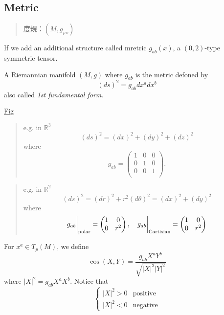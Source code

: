 \subsection{Metric} %

\begin{quote}
	度規：$(M,g_{\mu\nu})$
\end{quote}

If we add an additional structure called mretric $g_{ab}(x)$, a $(0,2)$-type symmetric tensor.


A Riemannian manifold $(M,g)$ where $g_{ab}$ is the metric defoned by
\begin{equation}
(ds)^{2} = g_{ab}dx^{a}dx^{b}
\end{equation}
also called \textit{1st fundamental form}.

\underline{Fig}

\begin{quote}
	e.g. in $\mathbb{R}^{3}$
\begin{equation}
(ds)^2 = (dx)^2 + (dy)^2 + (dz)^2
\end{equation}
where
\begin{equation}
g_{ab}=\begin{pmatrix}
1 & 0 & 0\\
0 & 1 & 0\\
0 & 0 & 1\\
\end{pmatrix}.
\end{equation}

\end{quote}
\begin{quote}
	e.g. in $\mathbb{R}^{2}$
\begin{equation}
(ds)^2 = (dr)^2 + r^2(d\theta)^2 = (dx)^2 + (dy)^2
\end{equation}
where
\begin{equation}
g_{ab}\bigg|_{\rm polar} = \begin{pmatrix}1 & 0\\ 0 & r^2\end{pmatrix}
,\quad
g_{ab}\bigg|_{\rm Cartisian} = \begin{pmatrix}1 & 0\\ 0 & r^2\end{pmatrix}
\end{equation}

\end{quote}
For $x^{a} \in T_{p}(M)$, we define
\begin{equation}
\cos(X,Y) = \frac{g_{ab}X^{a}Y^{b}}{\sqrt{|X|^2|Y|^2}}
\end{equation}
where $|X|^2 = g_{ab}X^{a}X^{b}$. Notice that
\begin{equation}
\begin{cases}
|X|^2 > 0 & \text{positive}\\
|X|^2 < 0 & \text{negative}
\end{cases}
\end{equation}


